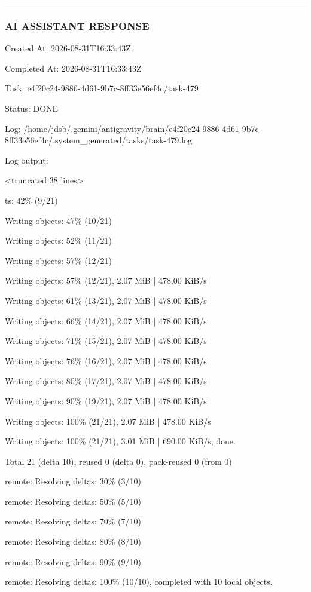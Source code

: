 \documentclass[11pt,a4paper]{article}
\begin{document}
\hrule

\subsubsection{AI ASSISTANT RESPONSE}

Created At: 2026-08-31T16:33:43Z

Completed At: 2026-08-31T16:33:43Z

Task: e4f20c24-9886-4d61-9b7c-8ff33e56ef4c/task-479

Status: DONE

Log: /home/jdsb/.gemini/antigravity/brain/e4f20c24-9886-4d61-9b7c-8ff33e56ef4c/.system\_generated/tasks/task-479.log

Log output:

<truncated 38 lines>

ts:  42\% (9/21)

Writing objects:  47\% (10/21)

Writing objects:  52\% (11/21)

Writing objects:  57\% (12/21)

Writing objects:  57\% (12/21), 2.07 MiB | 478.00 KiB/s

Writing objects:  61\% (13/21), 2.07 MiB | 478.00 KiB/s

Writing objects:  66\% (14/21), 2.07 MiB | 478.00 KiB/s

Writing objects:  71\% (15/21), 2.07 MiB | 478.00 KiB/s

Writing objects:  76\% (16/21), 2.07 MiB | 478.00 KiB/s

Writing objects:  80\% (17/21), 2.07 MiB | 478.00 KiB/s

Writing objects:  90\% (19/21), 2.07 MiB | 478.00 KiB/s

Writing objects: 100\% (21/21), 2.07 MiB | 478.00 KiB/s

Writing objects: 100\% (21/21), 3.01 MiB | 690.00 KiB/s, done.

Total 21 (delta 10), reused 0 (delta 0), pack-reused 0 (from 0)

remote: Resolving deltas:  30\% (3/10)

remote: Resolving deltas:  50\% (5/10)

remote: Resolving deltas:  70\% (7/10)

remote: Resolving deltas:  80\% (8/10)

remote: Resolving deltas:  90\% (9/10)

remote: Resolving deltas: 100\% (10/10), completed with 10 local objects.
\end{document}

